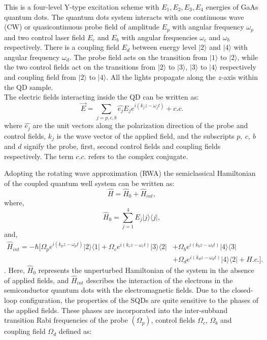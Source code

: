 \documentclass[12pt,a4paper]{article}
\begin{document}
This is a four-level Y-type excitation scheme with \(E_1,E_2,E_3,E_4\) energies of GaAs quantum dots. The quantum dots system interacts with one continuous wave (CW) or quasicontinuous probe field of amplitude \(E_p\) with angular frequency \(\omega_p\) and two control laser field \(E_c\) and \(E_b\) with angular frequencies \(\omega_c\) and \(\omega_b\) respectively. There is a coupling field \(E_d\) between energy level \(|2\rangle\) and \(|4\rangle\) with angular frequency \(\omega_d\). The probe field acts on the transition from \(|1\rangle\) to \(|2\rangle\), while the two control fields act on the transitions from \(|2\rangle\) to \(|3\rangle\), \(|3\rangle\) to \(|4\rangle\) respectively and coupling field from \(|2\rangle\) to \(|4\rangle\). All the lights propagate along the \(z\)-axis within the QD sample.\\
 The electric fields interacting inside the QD can be written as:
 \begin{equation}
     \vec{E}=\sum_{j=p,c,b}\hat{e_j}E_j e^{i(k_j z-\omega_j t)}+c.c.
 \end{equation}
where \(\hat{e_j}\) are the unit vectors along the polarization direction of the probe and control fields, \(k_j\) is the wave vector of the applied field, and the subscripts \(p,\ c,\ b\) and \(d\) signify the probe, first, second control fields and coupling fields respectively. The term \(c.c\). refers to the complex conjugate.\par
Adopting the rotating wave approximation (RWA) the semiclassical Hamiltonian of the coupled quantum well system can be written as:
\begin{equation}
    \hat{H}=\hat{H}_0+\hat{H}_{int},
\end{equation}
where,
\begin{equation}
    \hat{H}_0=\sum_{j=1}^4E_j|j\rangle\langle j|,
\end{equation}
and,
\begin{align}
    \hat{H}_{int} = -\hbar[\Omega_p e^{i(k_p z-\omega_p t)}|2\rangle\langle 1|+\Omega_c e^{i(k_c z-\omega_c t)}|3\rangle\langle 2|&+\Omega_b e^{i(k_b z-\omega_b t)}|4\rangle\langle 3|\nonumber\\&+\Omega_d e^{i(k_d z-\omega_d t)}|4\rangle\langle 2|+H.c.].
\end{align}.
Here, \(\hat{H}_0\) represents the unperturbed Hamiltonian of the system in the absence of applied fields, and \(\hat{H}_{int}\) describes the interaction of the electrons in the semiconductor quantum dots with the electromagnetic fields. Due to the closed-loop configuration, the properties of the SQDs are quite sensitive to the phases of the applied fields. These phases are incorporated into the inter-subband transition Rabi frequencies of the probe \((\Omega_p)\), control fields \(\Omega_c\), \(\Omega_b\) and coupling field \(\Omega_d\) defined as:
\end{document}
